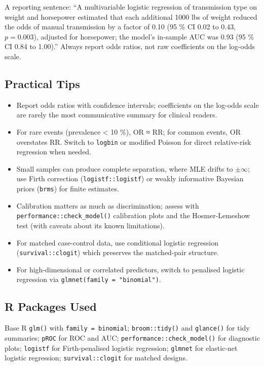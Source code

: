 \documentclass[
]{article}
\providecommand{\tightlist}{%
  \setlength{\itemsep}{0pt}\setlength{\parskip}{0pt}}
\begin{document}
A reporting sentence: ``A multivariable logistic regression of
transmission type on weight and horsepower estimated that each
additional 1000 lbs of weight reduced the odds of manual transmission by
a factor of 0.10 (95 \% CI 0.02 to 0.43, \(p = 0.003\)), adjusted for
horsepower; the model's in-sample AUC was 0.93 (95 \% CI 0.84 to
1.00).'' Always report odds ratios, not raw coefficients on the log-odds
scale.

\subsection{Practical Tips}\label{practical-tips}

\begin{itemize}
\tightlist
\item
  Report odds ratios with confidence intervals; coefficients on the
  log-odds scale are rarely the most communicative summary for clinical
  readers.
\item
  For rare events (prevalence \textless{} 10 \%), OR ≈ RR; for common
  events, OR overstates RR. Switch to \texttt{logbin} or modified
  Poisson for direct relative-risk regression when needed.
\item
  Small samples can produce complete separation, where MLE drifts to
  \(\pm\infty\); use Firth correction (\texttt{logistf::logistf}) or
  weakly informative Bayesian priors (\texttt{brms}) for finite
  estimates.
\item
  Calibration matters as much as discrimination; assess with
  \texttt{performance::check\_model()} calibration plots and the
  Hosmer-Lemeshow test (with caveats about its known limitations).
\item
  For matched case-control data, use conditional logistic regression
  (\texttt{survival::clogit}) which preserves the matched-pair
  structure.
\item
  For high-dimensional or correlated predictors, switch to penalised
  logistic regression via \texttt{glmnet(family\ =\ "binomial")}.
\end{itemize}

\subsection{R Packages Used}\label{r-packages-used}

Base R \texttt{glm()} with \texttt{family\ =\ binomial};
\texttt{broom::tidy()} and \texttt{glance()} for tidy summaries;
\texttt{pROC} for ROC and AUC; \texttt{performance::check\_model()} for
diagnostic plots; \texttt{logistf} for Firth-penalised logistic
regression; \texttt{glmnet} for elastic-net logistic regression;
\texttt{survival::clogit} for matched designs.
\end{document}
